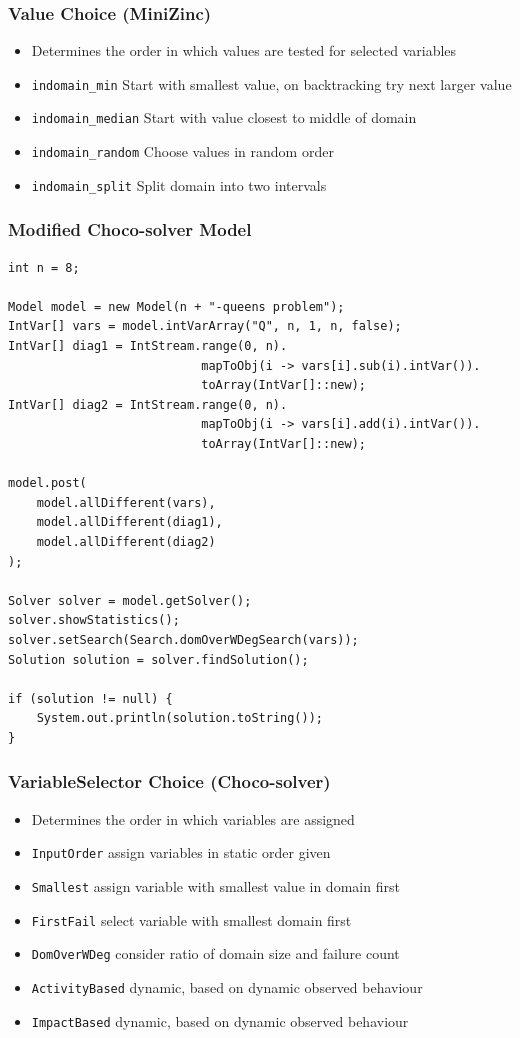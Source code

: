 \begin{frame}
\frametitle{Value Choice (MiniZinc)}
\begin{itemize}
\item Determines the order in which values are tested for selected variables
\item \texttt{indomain\_min} Start with smallest value, on backtracking try next larger value
\item \texttt{indomain\_median} Start with value closest to middle of domain
\item \texttt{indomain\_random} Choose values in random order
\item \texttt{indomain\_split} Split domain into two intervals
\end{itemize}
  \hyperlink{nqueens:continue mod}{}
\end{frame}


\begin{frame}[fragile]
\frametitle{Modified Choco-solver Model}
\label{nqueens:choco mod}
\tiny
\begin{verbatim}
int n = 8;

Model model = new Model(n + "-queens problem");
IntVar[] vars = model.intVarArray("Q", n, 1, n, false);
IntVar[] diag1 = IntStream.range(0, n).
                           mapToObj(i -> vars[i].sub(i).intVar()).
                           toArray(IntVar[]::new);
IntVar[] diag2 = IntStream.range(0, n).
                           mapToObj(i -> vars[i].add(i).intVar()).
                           toArray(IntVar[]::new);
                           
model.post(
    model.allDifferent(vars),
    model.allDifferent(diag1),
    model.allDifferent(diag2)
);

Solver solver = model.getSolver();
solver.showStatistics();
solver.setSearch(Search.domOverWDegSearch(vars));
Solution solution = solver.findSolution();

if (solution != null) {
    System.out.println(solution.toString());
}
\end{verbatim}
\end{frame}

\begin{frame}
\frametitle{VariableSelector Choice (Choco-solver)}
\begin{itemize}
\item Determines the order in which variables are assigned
\item \texttt{InputOrder} assign variables in static order given
\item \texttt{Smallest} assign variable with smallest value in domain first
\item \texttt{FirstFail} select variable with smallest domain first
\item \texttt{DomOverWDeg} consider ratio of domain size and failure count
\item \texttt{ActivityBased} dynamic, based on dynamic observed behaviour
\item \texttt{ImpactBased} dynamic, based on dynamic observed behaviour
\end{itemize}
\end{frame}


